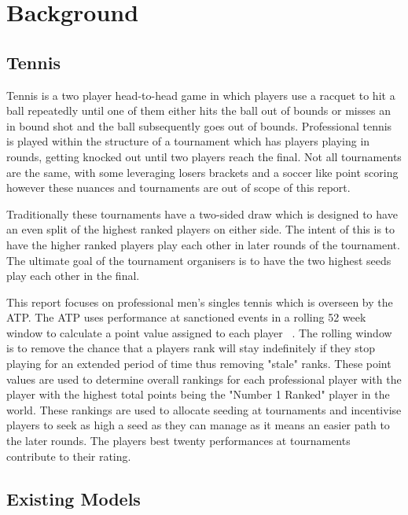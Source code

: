 \documentclass[12pt,a4paper]{article}
\begin{document}
\clearpage
\section{Background}

\subsection{Tennis}
Tennis is a two player head-to-head game in which players use a racquet to hit
a ball repeatedly until one of them either hits the ball out of bounds or misses
an in bound shot and the ball subsequently goes out of bounds. Professional tennis
is played within the structure of a tournament which has players playing in rounds,
getting knocked out until two players reach the final. Not all tournaments are
the same, with some leveraging losers brackets and a soccer like point scoring
however these nuances and tournaments are out of scope of this report.

Traditionally these tournaments have a two-sided draw which is designed to have
an even split of the highest ranked players on either side. The intent of this is
to have the higher ranked players play each other in later rounds of the tournament.
The ultimate goal of the tournament organisers is to have the two highest seeds
play each other in the final.

This report focuses on professional men's singles tennis which is overseen by
the ATP. The ATP uses performance at sanctioned events in a rolling 52 week
window to calculate a point value assigned to each player ~\cite{ATPTour2023}.
The rolling window is to remove the chance that a players rank will stay indefinitely
if they stop playing for an extended period of time thus removing "stale" ranks.
These point values are used to determine overall rankings for each professional
player with the player with the highest total points being the "Number 1 Ranked"
player in the world. These rankings are used to allocate seeding at tournaments
and incentivise players to seek as high a seed as they can manage as it means
an easier path to the later rounds. The players best twenty performances at tournaments
contribute to their rating.

\subsection{Existing Models}
\end{document}
